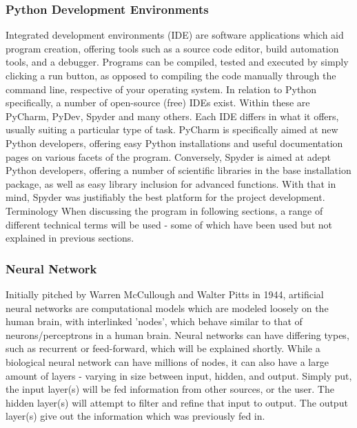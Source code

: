 \documentclass[12pt,a4paper]{article}
\makeatletter
\renewcommand\subsection{\@startsection {subsection}{1}{2mm}
                               {3pt plus 2pt minus 1pt}
                               {3pt plus 0pt}
                               {\normalfont\bfseries}}
\makeatother
\begin{document}
\subsubsection{Python Development Environments}
Integrated development environments (IDE) are software applications which aid program creation, offering tools such as a source code editor, build automation tools, and a debugger. Programs can be compiled, tested and executed by simply clicking a run button, as opposed to compiling the code manually through the command line, respective of your operating system. In relation to Python specifically, a number of open-source (free) IDEs exist. Within these are PyCharm, PyDev, Spyder and many others. Each IDE differs in what it offers, usually suiting a particular type of task. PyCharm is specifically aimed at new Python developers, offering easy Python installations and useful documentation pages on various facets of the program. Conversely, Spyder is aimed at adept Python developers, offering a number of scientific libraries in the base installation package, as well as easy library inclusion for advanced functions. With that in mind, Spyder was justifiably the best platform for the project development. \\

\subsection{Terminology}
When discussing the program in following sections, a range of different technical terms will be used - some of which have been used but not explained in previous sections.

\subsubsection{Neural Network}
Initially pitched by Warren McCullough and Walter Pitts in 1944, artificial neural networks are computational models which are modeled loosely on the human brain, with interlinked 'nodes', which behave similar to that of neurons/perceptrons in a human brain. Neural networks can have differing types, such as recurrent or feed-forward, which will be explained shortly. While a biological neural network can have millions of nodes, it can also have a large amount of layers - varying in size between input, hidden, and output. Simply put, the input layer(s) will be fed information from other sources, or the user. The hidden layer(s) will attempt to filter and refine that input to output. The output layer(s) give out the information which was previously fed in.
\end{document}
